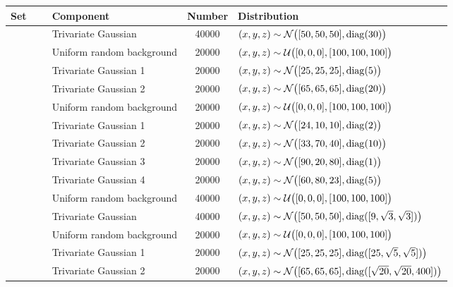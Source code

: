 
\begin{tabular}{@{}cclS[table-format=+1.1e+1,scientific-notation=true,round-mode=places,round-precision=1]l@{}}
\toprule
Set 			&~						& Component					& {Number} 	& Distribution\\
\midrule
\ferdosiOne 	&\legendComponentOne	& Trivariate Gaussian 		& 40000		& $(x, y, z) \sim \mathcal{N}\big([50, 50, 50], \operatorname{diag}(30)\big)$\\
~ 				&\legendComponentNoise	& Uniform random background	& 20000		& $(x, y, z) \sim \mathcal{U}\big([0, 0, 0], [100, 100, 100]\big)$\\
\hline
\ferdosiTwo 	&\legendComponentOne	& Trivariate Gaussian 1		& 20000		& $(x, y, z) \sim \mathcal{N}\big([25, 25, 25], \operatorname{diag}(5)\big)$\\
~ 				&\legendComponentTwo	& Trivariate Gaussian 2		& 20000		& $(x, y, z) \sim \mathcal{N}\big([65, 65, 65], \operatorname{diag}(20)\big)$\\
~ 				&\legendComponentNoise	& Uniform random background	& 20000		& $(x, y, z) \sim \mathcal{U}\big([0, 0, 0], [100, 100, 100]\big)$\\
\hline
\ferdosiThree	&\legendComponentOne 	& Trivariate Gaussian 1 	& 20000		& $(x, y, z) \sim \mathcal{N}\big([24, 10, 10], \operatorname{diag}(2)\big)$\\
~ 				&\legendComponentTwo	& Trivariate Gaussian 2 	& 20000		& $(x, y, z) \sim \mathcal{N}\big([33, 70, 40], \operatorname{diag}(10)\big)$\\
~ 				&\legendComponentThree	& Trivariate Gaussian 3 	& 20000		& $(x, y, z) \sim \mathcal{N}\big([90, 20, 80], \operatorname{diag}(1)\big)$\\
~ 				&\legendComponentFour	& Trivariate Gaussian 4 	& 20000		& $(x, y, z) \sim \mathcal{N}\big([60, 80, 23], \operatorname{diag}(5)\big)$\\
~ 				&\legendComponentNoise	& Uniform random background	& 40000		& $(x, y, z) \sim \mathcal{U}\big([0, 0, 0], [100, 100, 100]\big)$\\
\hline
\baakmanOne		&\legendComponentOne	& Trivariate Gaussian 		& 40000		& $(x, y, z) \sim \mathcal{N}\big([50, 50, 50], \operatorname{diag}([9, \sqrt{3}, \sqrt{3}])\big)$\\
~ 				&\legendComponentNoise	& Uniform random background	& 20000		& $(x, y, z) \sim \mathcal{U}\big([0, 0, 0], [100, 100, 100]\big)$\\
\hline
\baakmanTwo		&\legendComponentOne	& Trivariate Gaussian 1		& 20000		& $(x, y, z) \sim \mathcal{N}\big([25, 25, 25], \operatorname{diag}([25, \sqrt{5}, \sqrt{5}])\big)$\\
~ 				&\legendComponentTwo	& Trivariate Gaussian 2		& 20000		& $(x, y, z) \sim \mathcal{N}\big([65, 65, 65], \operatorname{diag}([\sqrt{20}, \sqrt{20}, 400])\big)$\\

\end{tabular}
